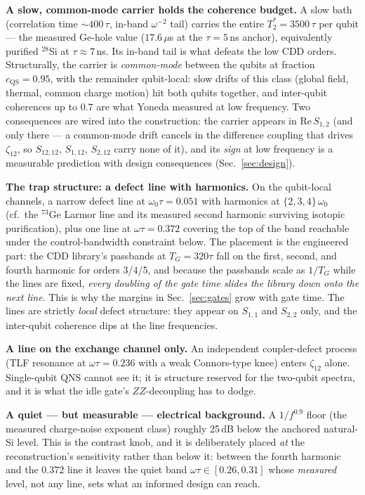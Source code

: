 \documentclass[10pt]{article}
\newcommand{\TG}{T_G}
\begin{document}
\textbf{A slow, common-mode carrier holds the coherence budget.} A slow bath
(correlation time $\sim 400\,\tau$, in-band $\omega^{-2}$ tail) carries the
entire $T_2^{*} = 3500\,\tau$ per qubit --- the measured Ge-hole value
($17.6\,\mu$s at the $\tau = 5$\,ns anchor), equivalently purified
$^{28}$Si at $\tau \approx 7$\,ns. Its in-band tail is what defeats the low
CDD orders. Structurally, the carrier is \emph{common-mode} between the
qubits at fraction $c_{\mathrm{QS}} = 0.95$, with the remainder qubit-local:
slow drifts of this class (global field, thermal, common charge motion) hit
both qubits together, and inter-qubit coherences up to $0.7$ are what Yoneda
measured at low frequency. Two consequences are wired into the construction:
the carrier appears in $\mathrm{Re}\,S_{1,2}$ (and only there --- a
common-mode drift cancels in the difference coupling that drives
$\zeta_{12}$, so $S_{12,12}$, $S_{1,12}$, $S_{2,12}$ carry none of it), and
its \emph{sign} at low frequency is a measurable prediction with design
consequences (Sec.~\ref{sec:design}).

\textbf{The trap structure: a defect line with harmonics.} On the qubit-local
channels, a narrow defect line at $\omega_0\tau = 0.051$ with harmonics at
$\{2,3,4\}\,\omega_0$ (cf.\ the $^{73}$Ge Larmor line and its measured second
harmonic surviving isotopic purification), plus one line at
$\omega\tau = 0.372$ covering the top of the band reachable under the
control-bandwidth constraint below. The placement is the engineered part: the
CDD library's passbands at $\TG = 320\tau$ fall on the first, second, and
fourth harmonic for orders 3/4/5, and because the passbands scale as $1/\TG$
while the lines are fixed, \emph{every doubling of the gate time slides the
library down onto the next line}. This is why the margins in
Sec.~\ref{sec:gates} grow with gate time. The lines are strictly
\emph{local} defect structure: they appear on $S_{1,1}$ and $S_{2,2}$ only,
and the inter-qubit coherence dips at the line frequencies.

\textbf{A line on the exchange channel only.} An independent coupler-defect
process (TLF resonance at $\omega\tau = 0.236$ with a weak Connors-type knee)
enters $\zeta_{12}$ alone. Single-qubit QNS cannot see it; it is structure
reserved for the two-qubit spectra, and it is what the idle gate's
$ZZ$-decoupling has to dodge.

\textbf{A quiet --- but measurable --- electrical background.}
A $1/f^{0.9}$ floor (the measured charge-noise exponent class) roughly
25\,dB below the anchored natural-Si level. This is the contrast knob, and
it is deliberately placed \emph{at} the reconstruction's sensitivity rather
than below it: between the fourth harmonic and the $0.372$ line it leaves
the quiet band $\omega\tau \in [0.26, 0.31]$ whose \emph{measured} level,
not any line, sets what an informed design can reach.
\end{document}
